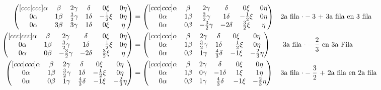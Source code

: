 \documentclass[letterpaper]{article}
\renewcommand{\*}{\cdot}
\theoremstyle{definition}
\begin{document}
\begin{align*}
\begin{pmatrix}[ccc|ccc]
		\alpha & \beta & 2\gamma & \delta & 0\xi & 0\eta\\
		0\alpha & 1\beta & \frac{3}{2}\gamma & 1\delta & -\frac{1}{2}\xi & 0\eta\\
		0\alpha & 3\beta & 3\gamma & 1\delta & 0\xi & \eta
		\end{pmatrix} & =\begin{pmatrix}[ccc|ccc]
		\alpha & \beta & 2\gamma & \delta & 0\xi & 0\eta\\
		0\alpha & 1\beta & \frac{3}{2}\gamma & 1\delta & -\frac{1}{2}\xi & 0\eta\\
		0\alpha & 0\beta & -\frac{3}{2}\gamma & -2\delta & \frac{3}{2}\xi & \eta
		\end{pmatrix} && \text{2a fila $ \* -3 $ + 3a fila en 3 fila}\\
		\begin{pmatrix}[ccc|ccc]
		\alpha & \beta & 2\gamma & \delta & 0\xi & 0\eta\\
		0\alpha & 1\beta & \frac{3}{2}\gamma & 1\delta & -\frac{1}{2}\xi & 0\eta\\
		0\alpha & 0\beta & -\frac{3}{2}\gamma & -2\delta & \frac{3}{2}\xi & \eta
		\end{pmatrix} & = \begin{pmatrix}[ccc|ccc]
		\alpha & \beta & 2\gamma & \delta & 0\xi & 0\eta\\
		0\alpha & 1\beta & \frac{3}{2}\gamma & 1\delta & -\frac{1}{2}\xi & 0\eta\\
		0\alpha & 0\beta & 1\gamma & \frac{4}{3}\delta & -1\xi & -\frac{2}{3}\eta
		\end{pmatrix} && \text{ 3a fila $ \* -\dfrac{2}{3} $ en 3a Fila}\\
		\begin{pmatrix}[ccc|ccc]
		\alpha & \beta & 2\gamma & \delta & 0\xi & 0\eta\\
		0\alpha & 1\beta & \frac{3}{2}\gamma & 1\delta & -\frac{1}{2}\xi & 0\eta\\
		0\alpha & 0\beta & 1\gamma & \frac{4}{3}\delta & -1\xi & -\frac{2}{3}\eta
		\end{pmatrix} & = \begin{pmatrix}[ccc|ccc]
		\alpha & \beta & 2\gamma & \delta & 0\xi & 0\eta\\
		0\alpha & 1\beta & 0\gamma & -1\delta & 1\xi & 1\eta\\
		0\alpha & 0\beta & 1\gamma & \frac{4}{3}\delta & -1\xi & -\frac{2}{3}\eta
		\end{pmatrix} && \text{3a fila $ \* -\dfrac{3}{2} $ + 2a fila en 2a fila}\\

\end{align*}
\end{document}
